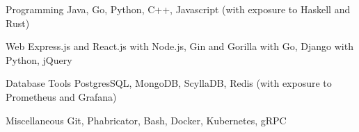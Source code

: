 \begin{cvskills}

  \cvskill
  {Programming}
  {Java, Go, Python, C++, Javascript (with exposure to Haskell and Rust)}
  
  \cvskill
  {Web}
  {Express.js and React.js with Node.js, Gin and Gorilla with Go, Django with Python, jQuery}

  \cvskill
  {Database Tools}
  {PostgresSQL, MongoDB, ScyllaDB, Redis (with exposure to Prometheus and Grafana)}

  \cvskill
  {Miscellaneous}
  {Git, Phabricator, Bash, Docker, Kubernetes, gRPC}

\end{cvskills}